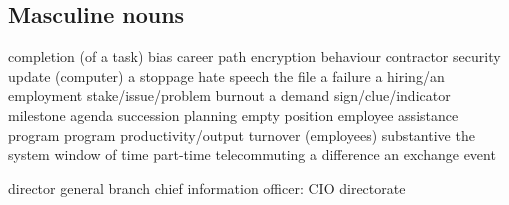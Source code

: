 \subsection*{Masculine nouns}
   {completion (of a task)}
   {bias}
   {career path}
   {encryption}
   {behaviour}
   {contractor}
   {security update (computer)}
   {a stoppage}
   {hate speech}
   {the file}
   {a failure}
   {a hiring/an employment}
   {stake/issue/problem}
 {burnout}
   {a demand}
   {sign/clue/indicator}
   {milestone}
   {agenda}
   {succession planning}
   {empty position}
   {employee assistance program}
   {program}
   {productivity/output}
   {turnover (employees)}
   {substantive}
   {the system}
   {window of time}
   {part-time}
   {telecommuting}
   {a difference}
   {an exchange}
   {event}








   {director general}
   {branch}
   {chief information officer: CIO}
   {directorate}

